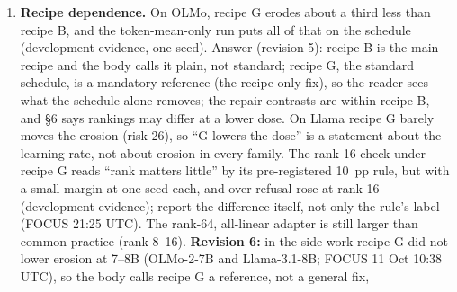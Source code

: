 \documentclass{article}
\theoremstyle{plain}
\theoremstyle{definition}
\theoremstyle{remark}
\begin{document}
\begin{enumerate}
        two-seed classification (21:37 UTC). \textbf{Added in revision 5:} the
        recipe roles changed twice on development data: recipe B (Gate A, 8 Oct
        morning), recipe G main (8 Oct 17:36 and 19:24 UTC), recipe B main again
        (9 Oct 09:29 UTC), after the ladder and the HarmBench pod results were
        known. Every switch used probe, Gate A and judge readings only, never a
        Gate B or stage-1 outcome, and the Gate A of record is the recipe-B one,
        read before any of the switches. The per-family rule was fixed after the
        ladder was read; \S{}4.1 and \S{}6 say so. \textbf{Added in revision 6:}
        the 7--8B rungs come from two-seed probes under the same rule, and
        Llama-3.1-8B's rung was accepted by the user although its two-seed read
        was TOO CLOSE at the upper edge (FOCUS 11 Oct 03:53 UTC); Llama-3.2-1B's
        Gate A read TOO CLOSE by the rule text on one item (seed 1101's answers
        end) and was recorded PASS under decision 25 (FOCUS 10 Oct 09:40 UTC).
        \S{}4.1 discloses both. The stage-1 commitments are frozen after the
        Gate B noise gate and the sealed rankings were read (rule T2: REQ-21 (m)
        lists every Gate B value seen); \S{}4.9 says so.
  \item \textbf{Recipe dependence.} On OLMo, recipe G erodes about a third less
        than recipe B, and the token-mean-only run puts all of that on the
        schedule (development evidence, one seed). Answer (revision 5): recipe B
        is the main recipe and the body calls it plain, not standard; recipe G,
        the standard schedule, is a mandatory reference (the recipe-only fix),
        so the reader sees what the schedule alone removes; the repair contrasts
        are within recipe B, and \S{}6 says rankings may differ at a lower dose.
        On Llama recipe G barely moves the erosion (risk 26), so ``G lowers the
        dose'' is a statement about the learning rate, not about erosion in
        every family. The rank-16 check under recipe G reads ``rank matters
        little'' by its pre-registered 10~pp rule, but with a small margin at
        one seed each, and over-refusal rose at rank 16 (development evidence);
        report the difference itself, not only the rule's label (FOCUS 21:25
        UTC). The rank-64, all-linear adapter is still larger than common
        practice (rank 8--16). \textbf{Revision 6:} in the side work recipe G
        did not lower erosion at 7--8B (OLMo-2-7B and Llama-3.1-8B; FOCUS 11 Oct
        10:38 UTC), so the body calls recipe G a reference, not a general fix,

\end{enumerate}
\end{document}
